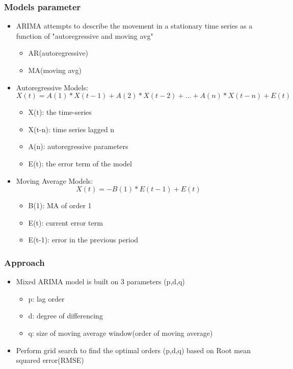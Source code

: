 \documentclass[11pt]{article}
\providecommand{\tightlist}{%
      \setlength{\itemsep}{0pt}\setlength{\parskip}{0pt}}
\begin{document}
\subsubsection{Models parameter}\label{models-parameter}

\begin{itemize}
\tightlist
\item
  ARIMA attempts to describe the movement in a stationary time series as
  a function of "autoregressive and moving avg"

  \begin{itemize}
  \tightlist
  \item
    AR(autoregressive)
  \item
    MA(moving avg)
  \end{itemize}
\item
  Autoregressive Models:
  \[X(t) = A(1)*X(t-1) + A(2)*X(t-2) +... + A(n)*X(t-n) + E(t)\]

  \begin{itemize}
  \tightlist
  \item
    X(t): the time-series
  \item
    X(t-n): time series lagged n
  \item
    A(n): autoregressive parameters
  \item
    E(t): the error term of the model
  \end{itemize}
\item
  Moving Average Models: \[X(t) = -B(1) * E(t-1) + E(t)\]

  \begin{itemize}
  \tightlist
  \item
    B(1): MA of order 1
  \item
    E(t): current error term
  \item
    E(t-1): error in the previous period
  \end{itemize}
\end{itemize}

\subsubsection{Approach}\label{approach}

\begin{itemize}
\tightlist
\item
  Mixed ARIMA model is built on 3 parameters (p,d,q)

  \begin{itemize}
  \tightlist
  \item
    p: lag order
  \item
    d: degree of differencing
  \item
    q: size of moving average window(order of moving average)
  \end{itemize}
\item
  Perform grid search to find the optimal orders (p,d,q) based on Root
  mean squared error(RMSE)
\end{itemize}
\end{document}
